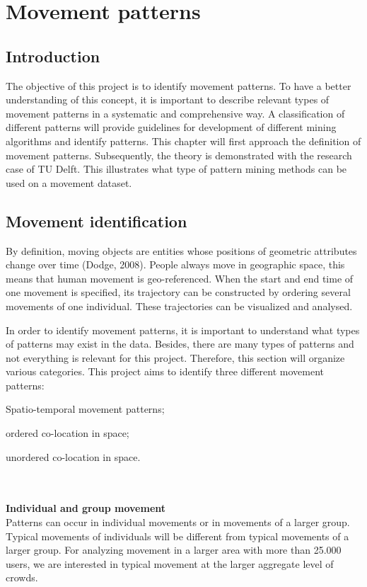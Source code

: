 \chapter{Movement patterns}\label{movementpatterns}

\section{Introduction}
The objective of this project is to identify movement patterns. To have a better understanding of this concept, it is important to describe relevant types of movement patterns in a systematic and comprehensive way. A classification of different patterns will provide guidelines for development of different mining algorithms and identify patterns. This chapter will first approach the definition of movement patterns. Subsequently, the theory is demonstrated with the research case of TU Delft. This illustrates what type of pattern mining methods can be used on a movement dataset. 

\section{Movement identification}
By definition, moving objects are entities whose positions of geometric attributes change over time (Dodge, 2008). People always move in geographic space, this means that human movement is geo-referenced. When the start and end time of one movement is specified, its trajectory can be constructed by ordering several movements of one individual. These trajectories can be visualized and analysed.

In order to identify movement patterns, it is important to understand what types of patterns may exist in the data. Besides, there are many types of patterns and not everything is relevant for this project. Therefore, this section will organize various categories. This project aims to identify three different movement patterns: \begin {enumerate*} [label=\itshape\arabic*\upshape),font={\color{red!0!black}\bfseries}] \item Spatio-temporal movement patterns; \item ordered co-location in space; \item unordered co-location in space. \end {enumerate*}\\\\
\textbf{Individual and group movement}\\
Patterns can occur in individual movements or in movements of a larger group. Typical movements of individuals will be different from typical movements of a larger group. For analyzing movement in a larger area with more than 25.000 users, we are interested in typical movement at the larger aggregate level of crowds. 

